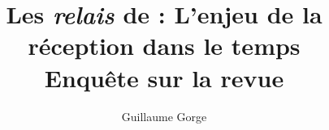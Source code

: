 \documentclass[oneside,10pt]{article}
\title{Les \textit{relais} de \LS : L’enjeu de la réception dans le temps \\
Enquête sur la revue \RLimite}
\author{Guillaume Gorge}
\begin{document}
 

\maketitle





\setcounter{page}{1}
 



%
%

% 
%
%
%

%
%

%

 

%
%

%
\begin{singlespace}

\end{singlespace}
\end{document}

